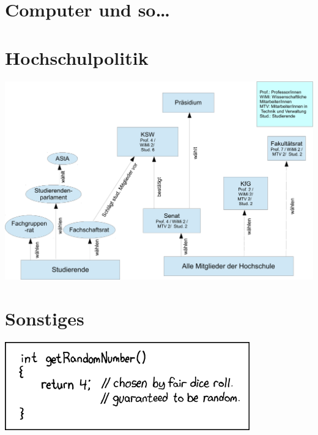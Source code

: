 \documentclass[]{papertex}
\begin{document}
	\section{Computer und so\ldots}
		\label{computer}
		
	\newpage

	\section{Hochschulpolitik}
		\label{politik}
		\begin{minipage}[H]{1.0\linewidth}
		\begin{center}
			\centering
			\includegraphics[angle=90 , totalheight=700pt, width=\textwidth]{bilder/gremienkunde3}
		\end{center}
		\end{minipage}
		\begin{multicols}{2}
		
		
		\end{multicols}
	\newpage

	\section{Sonstiges}
		\label{sonstiges}
		\begin{center}
		\includegraphics[totalheight=3cm]{bilder/XKCD/random_number}
		\end{center}
		\begin{multicols}{2}
		
		
		\end{multicols}
		\newpage
		
		\newpage
		
\end{document}
